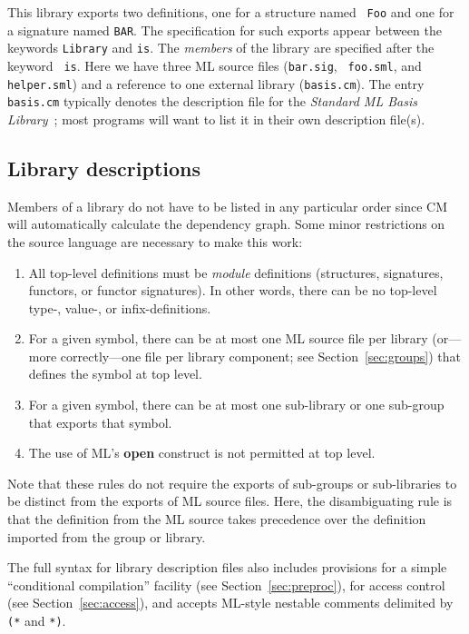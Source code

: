 \documentclass{article}
\begin{document}
This library exports two definitions, one for a structure named {\tt
Foo} and one for a signature named {\tt BAR}.  The specification for
such exports appear between the keywords {\tt Library} and {\tt is}.
The {\em members} of the library are specified after the keyword {\tt
is}.  Here we have three ML source files ({\tt bar.sig}, {\tt
foo.sml}, and {\tt helper.sml}) and a reference to one external
library ({\tt basis.cm}).  The entry {\tt basis.cm} typically denotes
the description file for the {\it Standard ML Basis
Library}~\cite{reppy99:basis}; most programs will want to list it in
their own description file(s).

\subsection{Library descriptions}

Members of a library do not have to be listed in any particular order
since CM will automatically calculate the dependency graph.  Some
minor restrictions on the source language are necessary to make this
work:
\begin{enumerate}
\item All top-level definitions must be {\em module} definitions
(structures, signatures, functors, or functor signatures).  In other
words, there can be no top-level type-, value-, or infix-definitions.
\item For a given symbol, there can be at most one ML source file per
library (or---more correctly---one file per library component; see
Section~\ref{sec:groups}) that defines the symbol at top level.
\item For a given symbol, there can be at most one sub-library or one
sub-group that exports that symbol.
\item The use of ML's {\bf open} construct is not permitted at top
level.
\end{enumerate}

Note that these rules do not require the exports of sub-groups or
sub-libraries to be distinct from the exports of ML source files.
Here, the disambiguating rule is that the definition from the ML
source takes precedence over the definition imported from the group or
library.

The full syntax for library description files also includes provisions
for a simple ``conditional compilation'' facility (see
Section~\ref{sec:preproc}), for access control (see
Section~\ref{sec:access}), and accepts ML-style nestable comments
delimited by \verb|(*| and \verb|*)|.
\end{document}

